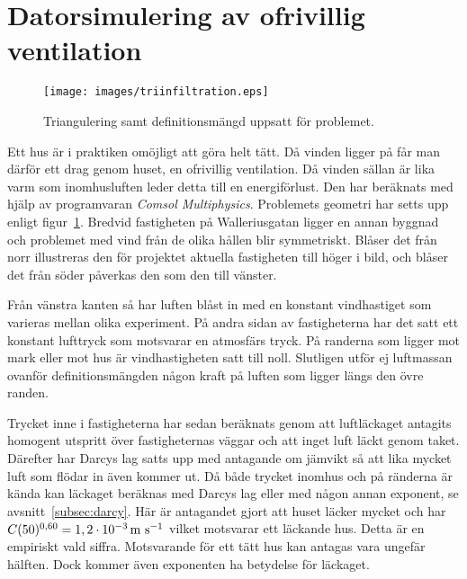 \section{Datorsimulering av ofrivillig ventilation}

\begin{figure}[b!]
\centering
\texttt{[image: images/triinfiltration.eps]}
\caption{Triangulering samt definitionsmängd uppsatt för problemet.}\label{fig:windmethod:tri}
\end{figure}

Ett hus är i praktiken omöjligt att göra helt tätt. Då vinden ligger på
får man därför ett drag genom huset, en ofrivillig ventilation. Då vinden
sällan är lika varm som inomhusluften leder detta till en energiförlust.
Den har beräknats med hjälp av programvaran \emph{Comsol Multiphysics}. Problemets geometri har
setts upp enligt figur~\ref{fig:windmethod:tri}. Bredvid fastigheten på Walleriusgatan ligger en annan byggnad och problemet med vind från de olika hållen blir symmetriskt. Blåser det från norr illustreras den för projektet aktuella fastigheten till höger i bild, och blåser det från söder påverkas den som den till vänster.

Från vänstra kanten så har luften blåst in med en konstant vindhastiget som varieras mellan olika
experiment. På andra sidan av fastigheterna har det satt ett konstant lufttryck som motsvarar en
atmosfärs tryck. På randerna som ligger mot mark eller mot hus är vindhastigheten satt till noll.
Slutligen utför ej luftmassan ovanför definitionsmängden någon kraft på luften som ligger längs den
övre randen.

Trycket inne i fastigheterna har sedan beräknats genom att luftläckaget antagits homogent utspritt över fastigheternas
väggar och att inget luft läckt genom taket. Därefter har Darcys lag satts upp med antagande om jämvikt så att lika mycket
luft som flödar in även kommer ut. Då både trycket inomhus och på ränderna är kända kan läckaget beräknas med Darcys lag
eller med någon annan exponent, se avsnitt~\ref{subsec:darcy}. Här är antagandet gjort att huset läcker mycket och har $C(50)^{0,60} = \unit[1,2\cdot 10^{-3}]{m~s^{-1}}$ vilket motsvarar ett läckande hus. Detta
är en empiriskt vald siffra. Motsvarande för ett tätt hus kan antagas vara ungefär hälften.
Dock kommer även exponenten ha betydelse för läckaget.\cite{sasic}
